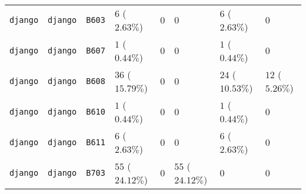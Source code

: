 \begin{table}
\begin{tabular}{llllllll}
\texttt{django} & \texttt{django} & \texttt{B603} & $6$ ($2.63\%$) & $0$ & $0$ & $6$ ($2.63\%$) & $0$ \\
\texttt{django} & \texttt{django} & \texttt{B607} & $1$ ($0.44\%$) & $0$ & $0$ & $1$ ($0.44\%$) & $0$ \\
\texttt{django} & \texttt{django} & \texttt{B608} & $36$ ($15.79\%$) & $0$ & $0$ & $24$ ($10.53\%$) & $12$ ($5.26\%$) \\
\texttt{django} & \texttt{django} & \texttt{B610} & $1$ ($0.44\%$) & $0$ & $0$ & $1$ ($0.44\%$) & $0$ \\
\texttt{django} & \texttt{django} & \texttt{B611} & $6$ ($2.63\%$) & $0$ & $0$ & $6$ ($2.63\%$) & $0$ \\
\texttt{django} & \texttt{django} & \texttt{B703} & $55$ ($24.12\%$) & $0$ & $55$ ($24.12\%$) & $0$ & $0$ \\
\bottomrule
\end{tabular}
\end{table}
